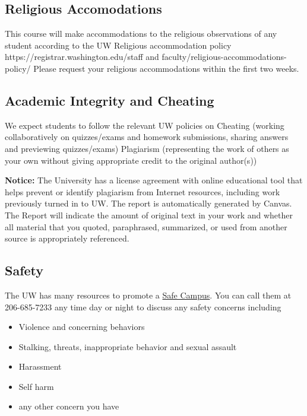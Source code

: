 \subsection{Religious Accomodations}
This course will make accommodations to the religious observations of any student according to the UW Religious accommodation policy https://registrar.washington.edu/staff and faculty/religious-accommodations-policy/
Please request your religious accommodations within the first two weeks.

    
\subsection{Academic Integrity and Cheating}
We expect students to follow the relevant UW policies on 
Cheating (working collaboratively on quizzes/exams and homework submissions, sharing answers and previewing quizzes/exams)
Plagiarism (representing the work of others as your own without giving appropriate credit to the original author(s)) 

{\bf 
    Notice:} The University has a license agreement with online educational tool 
that helps prevent or identify plagiarism from Internet resources, including 
work previously turned in to UW. The report is automatically generated by 
Canvas. The Report will indicate the amount of original text in your work and 
whether all material that you quoted, paraphrased, summarized, or used from 
another source is appropriately referenced.

\subsection{Safety} 


The UW has many resources to promote a \href{https://www.washington.edu/safecampus/}
{Safe Campus}.  You can call them at 206-685-7233 any time day or night
to discuss any safety concerns including 
\begin{itemize}
    \item Violence and concerning behaviors
    \item Stalking, threats, inappropriate behavior and sexual assault
    \item Harassment
    \item Self harm
    \item any other concern you have
\end{itemize}


